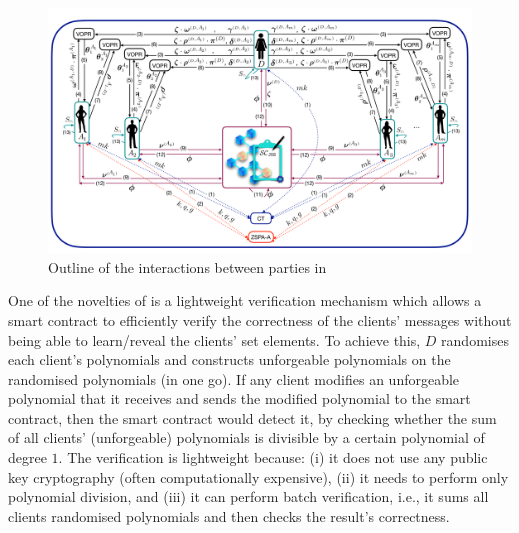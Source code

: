 \begin{figure}[htp]
    \centering
    \includegraphics[width=14cm]{Diag-1.pdf}
    \caption{Outline of the interactions between parties in \withFai}\label{fig:parties-interactions-in-Jus}
\end{figure}




One of the novelties of \fpsi is a lightweight verification mechanism which allows a smart contract to efficiently verify the correctness of the clients' messages without being able to learn/reveal the clients' set elements. To achieve this, $D$ randomises each client's polynomials and constructs unforgeable polynomials on the randomised polynomials (in one go). If any client modifies an unforgeable polynomial that it receives and sends the modified polynomial to the smart contract,  then the smart contract would detect it, by checking whether the sum of all clients' (unforgeable) polynomials is divisible by a certain polynomial of degree $1$.  The verification is lightweight because: (i) it does not use any public key cryptography (often computationally expensive), (ii) it needs to perform only polynomial division, and (iii) it can perform batch verification, i.e., it sums all clients randomised polynomials and then checks the result's correctness.






%


